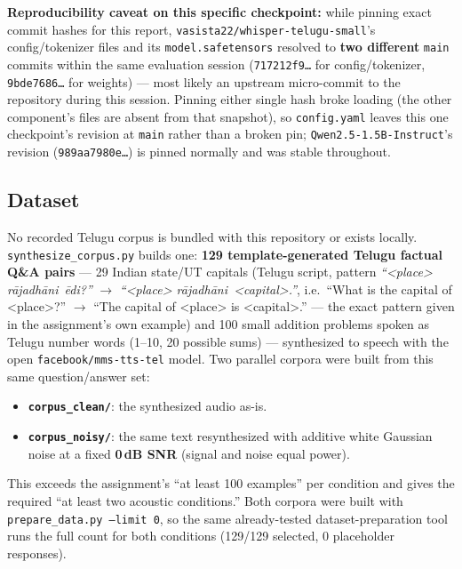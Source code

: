 \documentclass[11pt]{article}
\begin{document}
\textbf{Reproducibility caveat on this specific checkpoint:} while pinning exact commit hashes for this report, \texttt{vasista22/whisper-telugu-small}'s config/tokenizer files and its \texttt{model.safetensors} resolved to \textbf{two different} \texttt{main} commits within the same evaluation session (\texttt{717212f9\ldots} for config/tokenizer, \texttt{9bde7686\ldots} for weights) --- most likely an upstream micro-commit to the repository during this session. Pinning either single hash broke loading (the other component's files are absent from that snapshot), so \texttt{config.yaml} leaves this one checkpoint's revision at \texttt{main} rather than a broken pin; \texttt{Qwen2.5-1.5B-Instruct}'s revision (\texttt{989aa7980e\ldots}) is pinned normally and was stable throughout.

\subsection{Dataset}

No recorded Telugu corpus is bundled with this repository or exists locally. \texttt{synthesize\_corpus.py} builds one: \textbf{129 template-generated Telugu factual Q\&A pairs} --- 29 Indian state/UT capitals (Telugu script, pattern \textit{``<place> r\={a}jadh\={a}ni\ \={e}di?''} $\to$ \textit{``<place> r\={a}jadh\={a}ni\ <capital>.''}, i.e.\ ``What is the capital of <place>?'' $\to$ ``The capital of <place> is <capital>.'' --- the exact pattern given in the assignment's own example) and 100 small addition problems spoken as Telugu number words (1--10, 20 possible sums) --- synthesized to speech with the open \texttt{facebook/mms-tts-tel} model. Two parallel corpora were built from this same question/answer set:

\begin{itemize}[leftmargin=1.4em]
\item \textbf{\texttt{corpus\_clean/}}: the synthesized audio as-is.
\item \textbf{\texttt{corpus\_noisy/}}: the same text resynthesized with additive white Gaussian noise at a fixed \textbf{0\,dB SNR} (signal and noise equal power).
\end{itemize}

This exceeds the assignment's ``at least 100 examples'' per condition and gives the required ``at least two acoustic conditions.'' Both corpora were built with \texttt{prepare\_data.py --limit 0}, so the same already-tested dataset-preparation tool runs the full count for both conditions (129/129 selected, 0 placeholder responses).
\end{document}
